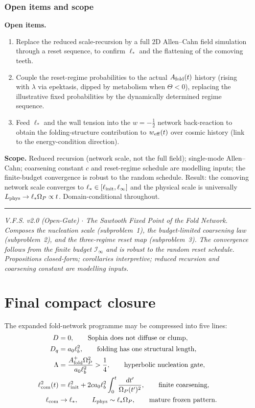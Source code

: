 \documentclass[11pt,a4paper]{article}
\newcommand{\Op}{\Omega_P}
\newcommand{\Af}{A_{\rm fold}}
\newcommand{\Dq}{D_q}
\newcommand{\ellcom}{\ell_{\rm com}}
\newcommand{\Lp}{L_{\rm phys}}
\newcommand{\ellinit}{\ell_{\rm init}}
\newcommand{\linit}{\ell_{\rm init}}
\newcommand{\Lam}{\Lambda}
\newcommand{\Ib}{\mathcal I}
\theoremstyle{plain}
\theoremstyle{definition}
\theoremstyle{remark}
\begin{document}
\subsubsection{Open items and scope}

\textbf{Open items.}
\begin{enumerate}[leftmargin=1.6em,itemsep=2pt]
\item Replace the reduced scale-recursion by a full $2$D Allen--Cahn field simulation through a reset
sequence, to confirm $\ell_\ast$ and the flattening of the comoving teeth.
\item Couple the reset-regime probabilities to the actual $\Af(t)$ history (rising with $\lambda$ via
epektasis, dipped by metabolism when $\Theta<0$), replacing the illustrative fixed probabilities by the
dynamically determined regime sequence.
\item Feed $\ell_\ast$ and the wall tension into the $w=-\tfrac12$ network back-reaction to obtain the
folding-structure contribution to $w_{\rm eff}(t)$ over cosmic history (link to the energy-condition
direction).
\end{enumerate}

\textbf{Scope.} Reduced recursion (network scale, not the full field); single-mode Allen--Cahn; coarsening
constant $c$ and reset-regime schedule are modelling inputs; the finite-budget convergence is robust to
the random schedule. Result: the comoving network scale converges to $\ell_\ast\in[\linit,\ell_\infty]$
and the physical scale is universally $\Lp\to\ell_\ast\Op\propto t$. Domain-conditional throughout.

\vspace{0.5em}
\hrule
\smallskip
\noindent\footnotesize\emph{V.F.S. v2.0 (Open-Gate) $\cdot$ The Sawtooth Fixed Point of the Fold Network.
Composes the nucleation scale (subproblem~1), the budget-limited coarsening law (subproblem~2), and the
three-regime reset map (subproblem~3). The convergence follows from the finite budget $\Ib_\infty$ and is
robust to the random reset schedule. Propositions closed-form; corollaries interpretive; reduced recursion
and coarsening constant are modelling inputs.}
\newpage
\section{Final compact closure}
The expanded fold-network programme may be compressed into five lines:
\begin{align}
D&=0,\qquad \text{Sophia does not diffuse or clump},\\
\Dq&=a_0\ell_b^2,\qquad \text{folding has one structural length},\\
\Lam&=\frac{\Af^+\Op^2}{a_0\ell_b^2}>\frac14,\qquad \text{hyperbolic nucleation gate},\\
\ellcom^2(t)&=\ellinit^2+2c a_0\ell_b^2\int_0^t\frac{dt'}{\Op(t')^2},\qquad \text{finite coarsening},\\
\ellcom&\to\ell_\ast,\qquad L_{\rm phys}\sim\ell_\ast\Op,\qquad \text{mature frozen pattern}.
\end{align}
\end{document}
